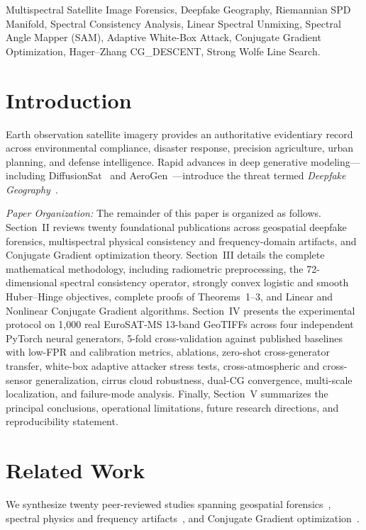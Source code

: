\documentclass[journal]{IEEEtran}
\begin{document}
\begin{IEEEkeywords}
Multispectral Satellite Image Forensics, Deepfake Geography, Riemannian SPD Manifold, Spectral Consistency Analysis, Linear Spectral Unmixing, Spectral Angle Mapper (SAM), Adaptive White-Box Attack, Conjugate Gradient Optimization, Hager--Zhang CG\_DESCENT, Strong Wolfe Line Search.
\end{IEEEkeywords}

\section{Introduction}
Earth observation satellite imagery provides an authoritative evidentiary record across environmental compliance, disaster response, precision agriculture, urban planning, and defense intelligence. Rapid advances in deep generative modeling---including DiffusionSat~\cite{khanna2024} and AeroGen~\cite{tang2025}---introduce the threat termed \textit{Deepfake Geography}~\cite{zhao2021}.

\textit{Paper Organization:} The remainder of this paper is organized as follows. Section~II reviews twenty foundational publications across geospatial deepfake forensics, multispectral physical consistency and frequency-domain artifacts, and Conjugate Gradient optimization theory. Section~III details the complete mathematical methodology, including radiometric preprocessing, the 72-dimensional spectral consistency operator, strongly convex logistic and smooth Huber--Hinge objectives, complete proofs of Theorems~1--3, and Linear and Nonlinear Conjugate Gradient algorithms. Section~IV presents the experimental protocol on 1,000 real EuroSAT-MS 13-band GeoTIFFs across four independent PyTorch neural generators, 5-fold cross-validation against published baselines with low-FPR and calibration metrics, ablations, zero-shot cross-generator transfer, white-box adaptive attacker stress tests, cross-atmospheric and cross-sensor generalization, cirrus cloud robustness, dual-CG convergence, multi-scale localization, and failure-mode analysis. Finally, Section~V summarizes the principal conclusions, operational limitations, future research directions, and reproducibility statement.

\section{Related Work}
We synthesize twenty peer-reviewed studies spanning geospatial forensics~\cite{zhao2021,qi2025,horvath2021,horvath2020,abady2022,yarlagadda2018,khanna2024,tang2025}, spectral physics and frequency artifacts~\cite{durall2020,corvi2023,ojha2023,helber2019,bioucas2012,kruse1993,vivone2015}, and Conjugate Gradient optimization~\cite{hestenes1952,fletcher1964,dai1999,hager2005,hager2006}.
\end{document}
